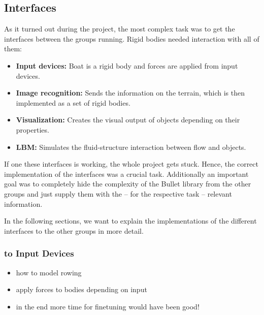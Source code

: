 \subsection{Interfaces}
As it turned out during the project, the most complex task was to get the interfaces between the groups running. Rigid bodies needed interaction with all of them:
\begin{itemize}
\item \textbf{Input devices:} Boat is a rigid body and forces are applied from input devices.
\item \textbf{Image recognition:} Sends the information on the terrain, which is then implemented as a set of rigid bodies.
\item \textbf{Visualization:} Creates the visual output of objects depending on their properties.
\item \textbf{LBM:} Simulates the fluid-structure interaction between flow and objects.
\end{itemize}
If one these interfaces is working, the whole project gets stuck. Hence, the correct implementation of the interfaces was a crucial task.
Additionally an important goal was to completely hide the complexity of the Bullet library from the other groups and just supply them with the -- for the respective task -- relevant information.

In the following sections, we want to explain the implementations of the different interfaces to the other groups in more detail.
\subsubsection{to Input Devices}
\begin{itemize}
\item how to model rowing
\item apply forces to bodies depending on input
\item in the end more time for finetuning would have been good!
\end{itemize}

